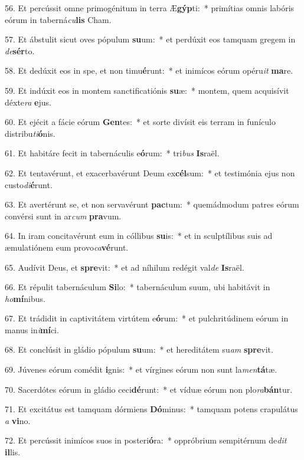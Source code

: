 56. Et percússit omne primogénitum in terra Æ\textbf{gýp}ti:~*  primítias omnis labóris eórum in taberná\textit{cu}\textbf{lis} Cham.\

57. Et ábstulit sicut oves pópulum \textbf{su}um:~*  et perdúxit eos tamquam gregem in \textit{de}\textbf{sér}to.\

58. Et dedúxit eos in spe, et non timu\textbf{é}runt:~*  et inimícos eórum opéru\textit{it} \textbf{ma}re.\

59. Et indúxit eos in montem sanctificatiónis \textbf{su}æ:~*  montem, quem acquisívit déxte\textit{ra} \textbf{e}jus.\

60. Et ejécit a fácie eórum \textbf{Gen}tes:~*  et sorte divísit eis terram in funículo distribu\textit{ti}\textbf{ó}nis.\

61. Et habitáre fecit in tabernáculis e\textbf{ó}rum:~*  tri\textit{bus} \textbf{Is}raël.\

62. Et tentavérunt, et exacerbavérunt Deum ex\textbf{cél}sum:~*  et testimónia ejus non custo\textit{di}\textbf{é}runt.\

63. Et avertérunt se, et non servavérunt \textbf{pac}tum:~*  quemádmodum patres eórum convérsi sunt in ar\textit{cum} \textbf{pra}vum.\

64. In iram concitavérunt eum in cóllibus \textbf{su}is:~*  et in sculptílibus suis ad æmulatiónem eum provo\textit{ca}\textbf{vé}runt.\

65. Audívit Deus, et \textbf{spre}vit:~*  et ad níhilum redégit val\textit{de} \textbf{Is}raël.\

66. Et répulit tabernáculum \textbf{Si}lo:~*  tabernáculum suum, ubi habitávit in \textit{ho}\textbf{mí}nibus.\

67. Et trádidit in captivitátem virtútem e\textbf{ó}rum:~*  et pulchritúdinem eórum in manus in\textit{i}\textbf{mí}ci.\

68. Et conclúsit in gládio pópulum \textbf{su}um:~*  et hereditátem su\textit{am} \textbf{spre}vit.\

69. Júvenes eórum comédit \textbf{i}gnis:~*  et vírgines eórum non sunt la\textit{men}\textbf{tá}tæ.\

70. Sacerdótes eórum in gládio ceci\textbf{dé}runt:~*  et víduæ eórum non plo\textit{ra}\textbf{bán}tur.\

71. Et excitátus est tamquam dórmiens \textbf{Dó}minus:~*  tamquam potens crapulátus \textit{a} \textbf{vi}no.\

72. Et percússit inimícos suos in posteri\textbf{ó}ra:~*  oppróbrium sempitérnum de\textit{dit} \textbf{il}lis.\

